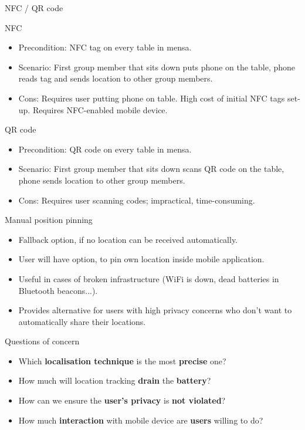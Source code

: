 \documentclass[9pt]{beamer}
\begin{document}
\begin{frame}{NFC / QR code}

	NFC
	\begin{itemize}
		\setlength{\itemsep}{1ex}
		\item Precondition: NFC tag on every table in mensa.
		\item Scenario: First group member that sits down puts phone on the table, phone reads tag and sends location to other group members.
		\item Cons: Requires user putting phone on table. High cost of initial NFC tags set-up. Requires NFC-enabled mobile device.
	\end{itemize}
	
	\bigskip
	QR code
	\begin{itemize}
		\setlength{\itemsep}{1ex}
		\item Precondition: QR code on every table in mensa.
		\item Scenario: First group member that sits down scans QR code on the table, phone sends location to other group members.
		\item Cons: Requires user scanning codes; impractical, time-consuming. 
	\end{itemize}

\end{frame}

\begin{frame}{Manual position pinning}

	\begin{itemize}
	
		\item Fallback option, if no location can be received automatically.
		\item User will have option, to pin own location inside mobile application.
		\item Useful in cases of broken infrastructure (WiFi is down, dead batteries in Bluetooth beacons...).
		\item Provides alternative for users with high privacy concerns who don't want to automatically share their locations.

	\end{itemize}

\end{frame}

\begin{frame}{Questions of concern}

	\begin{itemize}
	
		\item Which \textbf{localisation technique} is the most \textbf{precise} one?
		\item How much will location tracking \textbf{drain} the \textbf{battery}?
		\item How can we ensure the \textbf{user's privacy} is \textbf{not violated}?
		\item How much \textbf{interaction} with mobile device are \textbf{users} willing to do?
		
	\end{itemize}

\end{frame}
\end{document}
